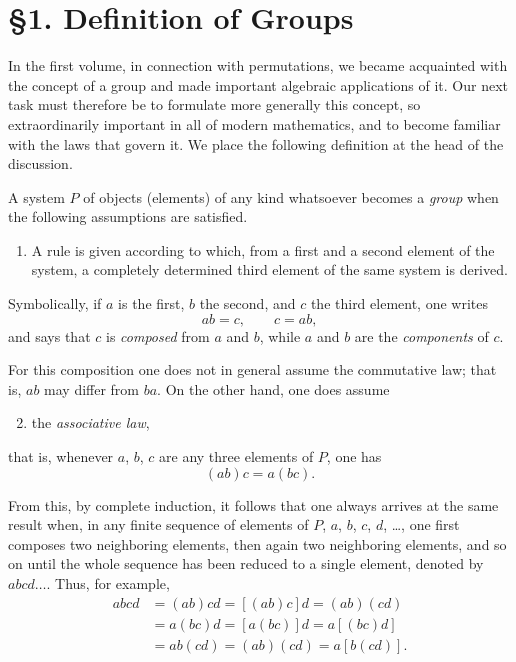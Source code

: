 \documentclass[11pt,a4paper]{book}
\begin{document}
\section*{\S 1. Definition of Groups}
In the first volume, in connection with permutations, we became acquainted with the concept of a group and made important algebraic applications of it. Our next task must therefore be to formulate more generally this concept, so extraordinarily important in all of modern mathematics, and to become familiar with the laws that govern it. We place the following definition at the head of the discussion.

A system $P$ of objects (elements) of any kind whatsoever becomes a \emph{group} when the following assumptions are satisfied.

\begin{enumerate}
\item A rule is given according to which, from a first and a second element of the system, a completely determined third element of the same system is derived.
\end{enumerate}

Symbolically, if $a$ is the first, $b$ the second, and $c$ the third element, one writes
\[
ab=c,\qquad c=ab,
\]
and says that $c$ is \emph{composed} from $a$ and $b$, while $a$ and $b$ are the \emph{components} of $c$.

For this composition one does not in general assume the commutative law; that is, $ab$ may differ from $ba$. On the other hand, one does assume

\begin{enumerate}
\setcounter{enumi}{1}
\item the \emph{associative law},
\end{enumerate}
that is, whenever $a$, $b$, $c$ are any three elements of $P$, one has
\[
(ab)c=a(bc).
\]

From this, by complete induction, it follows that one always arrives at the same result when, in any finite sequence of elements of $P$, $a$, $b$, $c$, $d$, \dots, one first composes two neighboring elements, then again two neighboring elements, and so on until the whole sequence has been reduced to a single element, denoted by $abcd\dots$. Thus, for example,
\begin{align*}
abcd &= (ab)cd = [(ab)c]d = (ab)(cd) \\
     &= a(bc)d = [a(bc)]d = a[(bc)d] \\
     &= ab(cd) = (ab)(cd) = a[b(cd)].
\end{align*}
\end{document}
